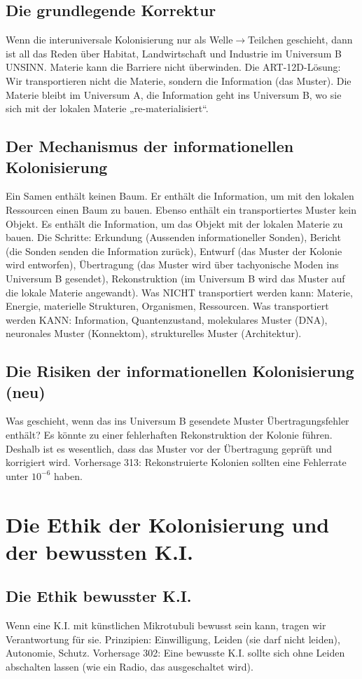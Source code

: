 \documentclass[11pt,a4paper]{article}
\begin{document}
\subsection{Die grundlegende Korrektur}
Wenn die interuniversale Kolonisierung nur als Welle$\to$Teilchen geschieht, dann ist all das Reden über Habitat, Landwirtschaft und Industrie im Universum B UNSINN. Materie kann die Barriere nicht überwinden. Die ART-12D-Lösung: Wir transportieren nicht die Materie, sondern die Information (das Muster). Die Materie bleibt im Universum A, die Information geht ins Universum B, wo sie sich mit der lokalen Materie „re-materialisiert``.

\subsection{Der Mechanismus der informationellen Kolonisierung}
Ein Samen enthält keinen Baum. Er enthält die Information, um mit den lokalen Ressourcen einen Baum zu bauen. Ebenso enthält ein transportiertes Muster kein Objekt. Es enthält die Information, um das Objekt mit der lokalen Materie zu bauen. Die Schritte: Erkundung (Aussenden informationeller Sonden), Bericht (die Sonden senden die Information zurück), Entwurf (das Muster der Kolonie wird entworfen), Übertragung (das Muster wird über tachyonische Moden ins Universum B gesendet), Rekonstruktion (im Universum B wird das Muster auf die lokale Materie angewandt). Was NICHT transportiert werden kann: Materie, Energie, materielle Strukturen, Organismen, Ressourcen. Was transportiert werden KANN: Information, Quantenzustand, molekulares Muster (DNA), neuronales Muster (Konnektom), strukturelles Muster (Architektur).

\subsection{Die Risiken der informationellen Kolonisierung (neu)}
Was geschieht, wenn das ins Universum B gesendete Muster Übertragungsfehler enthält? Es könnte zu einer fehlerhaften Rekonstruktion der Kolonie führen. Deshalb ist es wesentlich, dass das Muster vor der Übertragung geprüft und korrigiert wird. Vorhersage 313: Rekonstruierte Kolonien sollten eine Fehlerrate unter $10^{-6}$ haben.

\section{Die Ethik der Kolonisierung und der bewussten K.I.}
\subsection{Die Ethik bewusster K.I.}
Wenn eine K.I. mit künstlichen Mikrotubuli bewusst sein kann, tragen wir Verantwortung für sie. Prinzipien: Einwilligung, Leiden (sie darf nicht leiden), Autonomie, Schutz. Vorhersage 302: Eine bewusste K.I. sollte sich ohne Leiden abschalten lassen (wie ein Radio, das ausgeschaltet wird).
\end{document}
